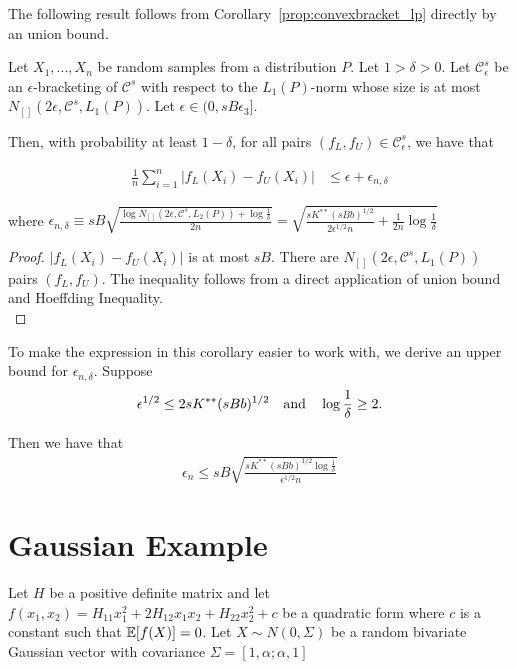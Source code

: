 The following result follows from Corollary~\ref{prop:convexbracket_lp} directly by an union bound. 

\begin{corollary}
\label{cor:convexbracket_ln}
Let $X_1,...,X_n$ be random samples from a distribution $P$. Let $1 > \delta > 0$. Let $\mathcal{C}^s_\epsilon$ be an $\epsilon$-bracketing of $\mathcal{C}^s$ with respect to the $L_1(P)$-norm whose size is at most $N_{[]}( 2\epsilon, \mathcal{C}^s, L_1(P))$. Let $\epsilon \in (0, s B \epsilon_3]$.

Then, with probability at least $1-\delta$, for all pairs $(f_L, f_U) \in \mathcal{C}^s_\epsilon$, we have that

\begin{align*}
\frac{1}{n} \sum_{i=1}^n |f_L(X_i) - f_U(X_i)| &\leq \epsilon + \epsilon_{n, \delta}
\end{align*}

where 
$\epsilon_{n,\delta} \equiv 
sB \sqrt{ \frac{ \log N_{[]}(2\epsilon, \mathcal{C}^s, L_2(P)) + \log \frac{1}{\delta}}{2n}} 
= \sqrt{ \frac{ sK^{**}(sBb)^{1/2}}{2\epsilon^{1/2}n} + \frac{1}{2n} \log \frac{1}{\delta}}$
\end{corollary}

\begin{proof}
$|f_L(X_i) - f_U(X_i)|$ is at most $sB$. There are $N_{[]}(2\epsilon, \mathcal{C}^s, L_1(P))$ pairs $(f_L, f_U)$. The inequality follows from a direct application of union bound and Hoeffding Inequality.\\
\end{proof}

To make the expression in this corollary easier to work with, we derive an upper bound for $\epsilon_{n, \delta}$. Suppose 
\begin{align}
\epsilon^{1/2} \leq 2sK^{**} (sBb)^{1/2} \quad \textrm{and} \quad \log \frac{1}{\delta} \geq 2. \label{cond:simplify_covering_number}
\end{align}

Then we have that
\begin{align*}
\epsilon_n \leq sB \sqrt{ \frac{ sK^{**} (sBb)^{1/2} \log \frac{1}{\delta}}{\epsilon^{1/2}n}}
\end{align*}

\section{Gaussian Example}
\label{sec:gaussian_example}

Let $H$ be a positive definite matrix and let $f(x_1, x_2) = H_{11} x_1^2 + 2H_{12} x_1x_2 + H_{22} x_2^2 + c$ be a quadratic form where $c$ is a constant such that ${\mathbb E}[f(X)] = 0$. Let $X \sim N(0, \Sigma)$ be a random bivariate Gaussian vector with covariance $\Sigma = [1, \alpha; \alpha, 1]$ 


